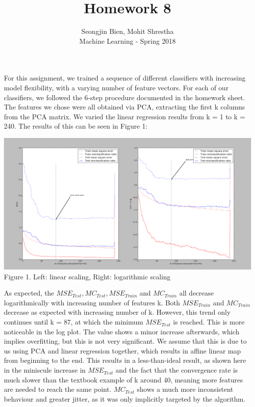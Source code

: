 \documentclass[12pt]{article}
\begin{document}
 
 
\title{Homework 8}%
\author{Seongjin Bien, Mohit Shrestha\\ %
Machine Learning - Spring 2018} %
 
\maketitle
For this assignment, we trained a sequence of different classifiers with increasing model flexibility, with a varying number of feature vectors. For each of our classifiers, we followed the 6-step procedure documented in the homework sheet. The features we chose were all obtained via PCA, extracting the first k columns from the PCA matrix. We varied the linear regression results from k = 1 to k = 240. The results of this can be seen in Figure 1:\\
\begin{center}
	\includegraphics[scale=0.30]{hw8plots.png}\\
	Figure 1. Left: linear scaling, Right: logarithmic scaling
\end{center}
    As expected, the $MSE_{Test}, MC_{Test}, MSE_{Train}$ and $MC_{Train}$ all decrease logarithmically with increasing number of features k. Both $MSE_{Train}$ and $MC_{Train}$ decrease as expected with increasing number of k. However, this trend only continues until k = 87, at which the minimum $MSE_{Test}$ is reached. This is more noticeable in the log plot. The value shows a minor increase afterwards, which implies overfitting, but this is not very significant. We assume that this is due to us using PCA and linear regression together, which results in affine linear map from beginning to the end. This results in a less-than-ideal result, as shown here in the miniscule increase in $MSE_{Test}$ and the fact that the convergence rate is much slower than the textbook example of k around 40, meaning more features are needed to reach the same point. $MC_{Test}$ shows a much more inconsistent behaviour and greater jitter, as it was only implicitly targeted by the algorithm. 
    
\end{document}
